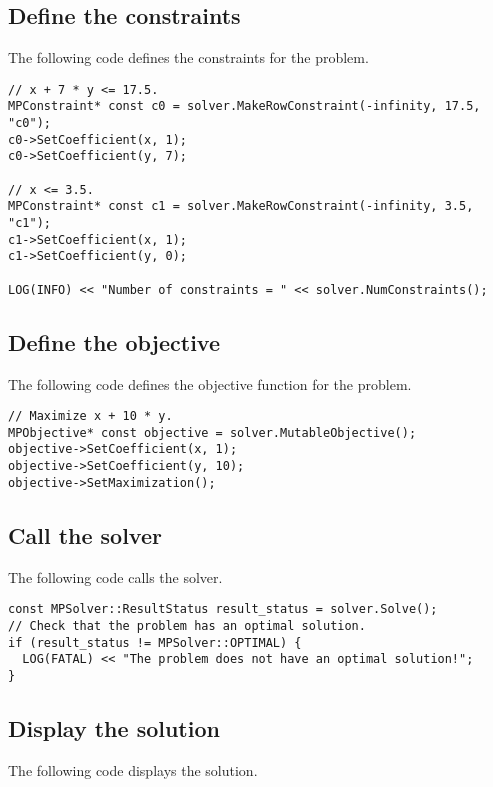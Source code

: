 \documentclass[a4paper,12pt,notitlepage,twoside,openright]{article}
\begin{document}
\subsection{Define the constraints}

The following code defines the constraints for the problem.

\begin{verbatim}
// x + 7 * y <= 17.5.
MPConstraint* const c0 = solver.MakeRowConstraint(-infinity, 17.5, "c0");
c0->SetCoefficient(x, 1);
c0->SetCoefficient(y, 7);

// x <= 3.5.
MPConstraint* const c1 = solver.MakeRowConstraint(-infinity, 3.5, "c1");
c1->SetCoefficient(x, 1);
c1->SetCoefficient(y, 0);

LOG(INFO) << "Number of constraints = " << solver.NumConstraints();
\end{verbatim}

\subsection{Define the objective}

The following code defines the objective function for the problem.

\begin{verbatim}
// Maximize x + 10 * y.
MPObjective* const objective = solver.MutableObjective();
objective->SetCoefficient(x, 1);
objective->SetCoefficient(y, 10);
objective->SetMaximization();
\end{verbatim}

\subsection{Call the solver}

The following code calls the solver.

\begin{verbatim}
const MPSolver::ResultStatus result_status = solver.Solve();
// Check that the problem has an optimal solution.
if (result_status != MPSolver::OPTIMAL) {
  LOG(FATAL) << "The problem does not have an optimal solution!";
}
\end{verbatim}

\subsection{Display the solution}

The following code displays the solution.
\end{document}
